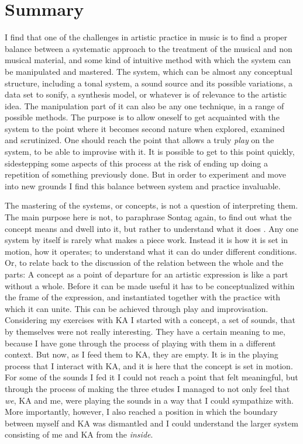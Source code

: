 \documentclass[11pt]{article}
\begin{document}
\section*{Summary}
\label{sec:org2c3bcd7}
I find that one of the challenges in artistic practice in music is to find a proper balance between a systematic approach to the treatment of the musical and non musical material, and some kind of intuitive method with which the system can be manipulated and mastered. The system, which can be almost any conceptual structure, including a tonal system, a sound source and its possible variations, a data set to sonify, a synthesis model, or whatever is of relevance to the artistic idea. The manipulation part of it can also be any one technique, in a range of possible methods. The purpose is to allow oneself to get acquainted with the system to the point where it becomes second nature when explored, examined and scrutinized. One should reach the point that allows a truly \emph{play} on the system, to be able to improvise with it. It is possible to get to this point quickly, sidestepping some aspects of this process at the risk of ending up doing a repetition of something previously done. But in order to experiment and move into new grounds I find this balance between system and practice invaluable.

The mastering of the systems, or concepts, is not a question of interpreting them. The main purpose here is not, to paraphrase Sontag again, to find out what the concept means and dwell into it, but rather to understand what it does \citep[Ch. 9]{Sontag1986}. Any one system by itself is rarely what makes a piece work. Instead it is how it is set in motion, how it operates; to understand what it can do under different conditions. Or, to relate back to the discussion of the relation between the whole and the parts: A concept as a point of departure for an artistic expression is like a part without a whole. Before it can be made useful it has to be conceptualized within the frame of the expression, and instantiated together with the practice with which it can unite. This can be achieved through play and improvisation. Considering my exercises with KA I started with a concept, a set of sounds, that by themselves were not really interesting. They have a certain meaning to me, because I have gone through the process of playing with them in a different context. But now, as I feed them to KA, they are empty. It is in the playing process that I interact with KA, and it is here that the concept is set in motion. For some of the sounds I fed it I could not reach a point that felt meaningful, but through the process of making the three etudes I managed to not only feel that \emph{we}, KA and me, were playing the sounds in a way that I could sympathize with. More importantly, however, I also reached a position in which the boundary between myself and KA was dismantled and I could understand the larger system consisting of me and KA from the \emph{inside}.
\end{document}
